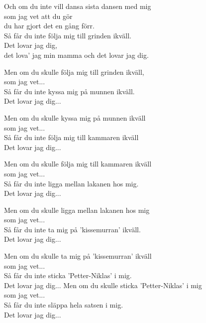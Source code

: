 \vspace{8pt}
Och om du inte vill dansa sista dansen med mig\\
som jag vet att du gör\\
du har gjort det en gång förr.\\
Så får du inte följa mig till grinden ikväll.\\
Det lovar jag dig,\\
det lova' jag min mamma och det lovar jag dig.\par
\vspace{8pt}
Men om du skulle följa mig till grinden ikväll,\\
som jag vet...\\
Så får du inte kyssa mig på munnen ikväll.\\
Det lovar jag dig...\par
\vspace{8pt}
Men om du skulle kyssa mig på munnen ikväll \\
som jag vet...\\
Så får du inte följa mig till kammaren ikväll\\
Det lovar jag dig...\par
\vspace{8pt}
Men om du skulle följa mig till kammaren ikväll\\
som jag vet...\\
Så får du inte ligga mellan lakanen hos mig.\\
Det lovar jag dig...\par
\vspace{8pt}
Men om du skulle ligga mellan lakanen hos mig\\
som jag vet...\\
Så får du inte ta mig på 'kissemurran' ikväll.\\
Det lovar jag dig...\par
\vspace{8pt}
Men om du skulle ta mig på 'kissemurran' ikväll\\
som jag vet...\\
Så får du inte sticka 'Petter-Niklas' i mig.\\
Det lovar jag dig...
\newpage
Men om du skulle sticka 'Petter-Niklas' i mig\\
som jag vet...\\
Så får du inte släppa hela satsen i mig.\\
Det lovar jag dig...\par
\vspace{10pt}
